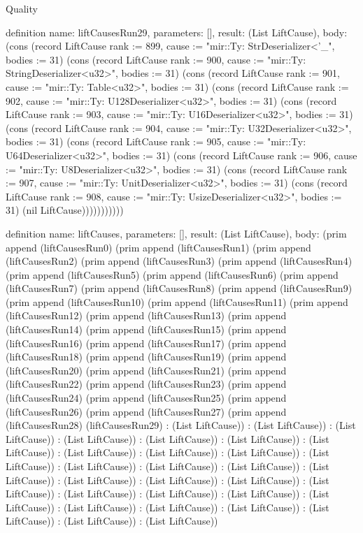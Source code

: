 \begin{lexlean}{Quality}
\begin{semanticmodule}
definition{
  name: liftCausesRun29,
  parameters: [],
  result: (List LiftCause),
  body: (cons (record LiftCause {rank := 899, cause := "mir::Ty: StrDeserializer<'_", bodies := 31}) (cons (record LiftCause {rank := 900, cause := "mir::Ty: StringDeserializer<u32>", bodies := 31}) (cons (record LiftCause {rank := 901, cause := "mir::Ty: Table<u32>", bodies := 31}) (cons (record LiftCause {rank := 902, cause := "mir::Ty: U128Deserializer<u32>", bodies := 31}) (cons (record LiftCause {rank := 903, cause := "mir::Ty: U16Deserializer<u32>", bodies := 31}) (cons (record LiftCause {rank := 904, cause := "mir::Ty: U32Deserializer<u32>", bodies := 31}) (cons (record LiftCause {rank := 905, cause := "mir::Ty: U64Deserializer<u32>", bodies := 31}) (cons (record LiftCause {rank := 906, cause := "mir::Ty: U8Deserializer<u32>", bodies := 31}) (cons (record LiftCause {rank := 907, cause := "mir::Ty: UnitDeserializer<u32>", bodies := 31}) (cons (record LiftCause {rank := 908, cause := "mir::Ty: UsizeDeserializer<u32>", bodies := 31}) (nil LiftCause)))))))))))
}

definition{
  name: liftCauses,
  parameters: [],
  result: (List LiftCause),
  body: (prim append (liftCausesRun0) (prim append (liftCausesRun1) (prim append (liftCausesRun2) (prim append (liftCausesRun3) (prim append (liftCausesRun4) (prim append (liftCausesRun5) (prim append (liftCausesRun6) (prim append (liftCausesRun7) (prim append (liftCausesRun8) (prim append (liftCausesRun9) (prim append (liftCausesRun10) (prim append (liftCausesRun11) (prim append (liftCausesRun12) (prim append (liftCausesRun13) (prim append (liftCausesRun14) (prim append (liftCausesRun15) (prim append (liftCausesRun16) (prim append (liftCausesRun17) (prim append (liftCausesRun18) (prim append (liftCausesRun19) (prim append (liftCausesRun20) (prim append (liftCausesRun21) (prim append (liftCausesRun22) (prim append (liftCausesRun23) (prim append (liftCausesRun24) (prim append (liftCausesRun25) (prim append (liftCausesRun26) (prim append (liftCausesRun27) (prim append (liftCausesRun28) (liftCausesRun29) : (List LiftCause)) : (List LiftCause)) : (List LiftCause)) : (List LiftCause)) : (List LiftCause)) : (List LiftCause)) : (List LiftCause)) : (List LiftCause)) : (List LiftCause)) : (List LiftCause)) : (List LiftCause)) : (List LiftCause)) : (List LiftCause)) : (List LiftCause)) : (List LiftCause)) : (List LiftCause)) : (List LiftCause)) : (List LiftCause)) : (List LiftCause)) : (List LiftCause)) : (List LiftCause)) : (List LiftCause)) : (List LiftCause)) : (List LiftCause)) : (List LiftCause)) : (List LiftCause)) : (List LiftCause)) : (List LiftCause)) : (List LiftCause))
}


\end{semanticmodule}
\end{lexlean}

